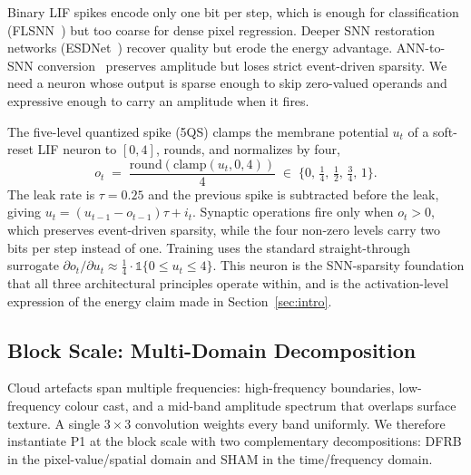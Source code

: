 \documentclass[conference]{IEEEtran}
\newcommand{\DFRB}{\textsc{DFRB}}
\newcommand{\SHAM}{\textsc{SHAM}}
\begin{document}
Binary LIF spikes encode only one bit per step, which is enough for
classification (FLSNN~\cite{ref:flsnn}) but too coarse for dense
pixel regression. Deeper SNN restoration networks
(ESDNet~\cite{ref:esdnet}) recover quality but erode the energy
advantage. ANN-to-SNN
conversion~\cite{ref:rueckauer2017} preserves amplitude but loses
strict event-driven sparsity. We need a neuron whose output is
sparse enough to skip zero-valued operands and expressive enough
to carry an amplitude when it fires.

The five-level quantized spike (5QS) clamps the membrane potential
$u_t$ of a soft-reset LIF neuron to $[0,4]$, rounds, and normalizes
by four,
\begin{equation}
o_t \;=\; \frac{\mathrm{round}(\mathrm{clamp}(u_t,0,4))}{4}\;\in\;
\Big\{0,\,\tfrac{1}{4},\,\tfrac{1}{2},\,\tfrac{3}{4},\,1\Big\}.
\label{eq:5qs-forward}
\end{equation}
The leak rate is $\tau\!=\!0.25$ and the previous spike is
subtracted before the leak, giving
$u_t\!=\!(u_{t-1}\!-\!o_{t-1})\tau+i_t$. Synaptic operations fire
only when $o_t\!>\!0$, which preserves event-driven sparsity, while
the four non-zero levels carry two bits per step instead of one.
Training uses the standard straight-through surrogate $\partial
o_t/\partial u_t \approx \tfrac{1}{4}\cdot\mathbb{1}\{0\!\le\!u_t\!\le\!4\}$.
This neuron is the SNN-sparsity foundation that all three
architectural principles operate within, and is the activation-level
expression of the energy claim made in Section~\ref{sec:intro}.

\subsection{Block Scale: Multi-Domain Decomposition}
\label{sec:framework-block}

Cloud artefacts span multiple frequencies: high-frequency boundaries,
low-frequency colour cast, and a mid-band amplitude spectrum that
overlaps surface texture. A single $3\!\times\!3$ convolution
weights every band uniformly. We therefore instantiate P1 at the
block scale with two complementary decompositions: \DFRB{} in the
pixel-value/spatial domain and \SHAM{} in the time/frequency domain.
\end{document}
